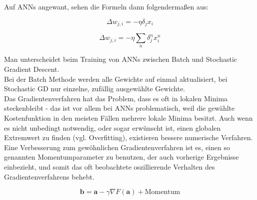 Auf ANNs angewant, sehen die Formeln dann folgendermaßen aus:

\begin{equation}
\Delta w_{j,i} = - \eta  \delta_j  x_i 
\end{equation}

\begin{equation}
\Delta w_{j,i} = - \eta  \sum_n \delta_j^n  x_i^n 
\end{equation}

\cite{bishop1995neural} 

Man unterscheidet beim Training von ANNs zwischen Batch und Stochastic Gradient Descent.\\

Bei der Batch Methode werden alle Gewichte auf einmal aktualisiert, bei Stochastic GD nur einzelne, zufällig ausgewählte Gewichte.\\

Das Gradientenverfahren hat das Problem, dass es oft in lokalen Minima steckenbleibt - das ist vor allem bei ANNs problematisch, weil die gewählte Kostenfunktion in den meisten Fällen mehrere lokale Minima besitzt. Auch wenn es nicht unbedingt notwendig, oder sogar erwünscht ist, einen globalen Extremwert zu finden (vgl. Overfitting), existieren bessere numerische Verfahren. \\

Eine Verbesserung zum gewöhnlichen Gradientenverfahren ist es, einen so genannten Momentumparameter zu benutzen, der auch vorherige Ergebnisse einbezieht, und somit das oft beobachtete oszillierende Verhalten des Gradientenverfahrens behebt.

\begin{equation}
 \mathbf{b} = \mathbf{a}-\gamma\nabla F(\mathbf{a}) + \text{Momentum}
\end{equation}